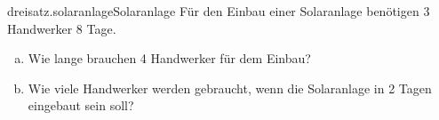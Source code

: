\begin{exercise}{dreisatz.solaranlage}{Solaranlage}
  \ifproblem\problem
    Für den Einbau einer Solaranlage benötigen 3 Handwerker 8 Tage.
    \begin{enumerate}[a)]
      \item Wie lange brauchen 4 Handwerker für dem Einbau?
      \item Wie viele Handwerker werden gebraucht, wenn die Solaranlage in 2 Tagen eingebaut sein soll?
    \end{enumerate}
  \fi
\end{exercise}
